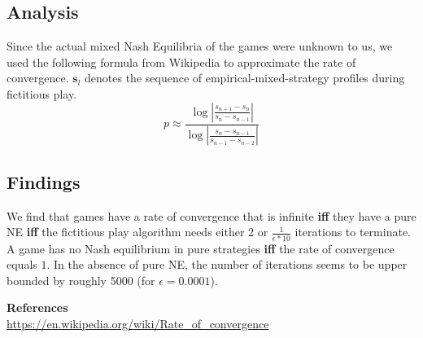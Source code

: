\documentclass[10pt,a4paper]{article}
\begin{document}
\subsection*{Analysis}
Since the actual mixed Nash Equilibria of the games were unknown to us, we used the following formula from Wikipedia to approximate the rate of convergence. $\boldsymbol{s}_l$ denotes the sequence of empirical-mixed-strategy profiles during fictitious play.
\begin{equation*}
p\approx\frac{\log{|\frac{s_{n+1}-s_{n}}{s_{n}-s_{n-1}}|}}{\log{|\frac{s_{n}-s_{n-1}}{s_{n-1}-s_{n-2}}|}}
\end{equation*}

\subsection*{Findings}
We find that games have a rate of convergence that is infinite \textbf{iff} they have a pure NE \textbf{iff} the fictitious play algorithm needs either 2 or $\tfrac{1}{\epsilon*10}$ iterations to terminate.\\
A game has no Nash equilibrium in pure strategies \textbf{iff} the rate of convergence equals $1$. In the absence of pure NE, the number of iterations seems to be upper bounded by roughly 5000 (for $\epsilon=0.0001$).

\textbf{References}\\
\url{https://en.wikipedia.org/wiki/Rate_of_convergence}
\end{document}
